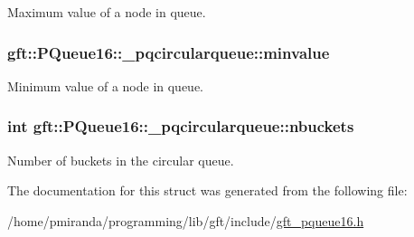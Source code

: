 Maximum value of a node in queue. 

\subsubsection[{\texorpdfstring{minvalue}{minvalue}}]{ gft\+::\+P\+Queue16\+::\+\_\+pqcircularqueue\+::minvalue}\hypertarget{structgft_1_1PQueue16_1_1__pqcircularqueue_a7cceb7dbbae52c61f53e44735ebb8156}{}\label{structgft_1_1PQueue16_1_1__pqcircularqueue_a7cceb7dbbae52c61f53e44735ebb8156}


Minimum value of a node in queue. 

\subsubsection[{\texorpdfstring{nbuckets}{nbuckets}}]{\setlength{\rightskip}{0pt plus 5cm}int gft\+::\+P\+Queue16\+::\+\_\+pqcircularqueue\+::nbuckets}\hypertarget{structgft_1_1PQueue16_1_1__pqcircularqueue_a04b672c1f097742297f79ca45672f248}{}\label{structgft_1_1PQueue16_1_1__pqcircularqueue_a04b672c1f097742297f79ca45672f248}


Number of buckets in the circular queue. 



The documentation for this struct was generated from the following file\+:\begin{DoxyCompactItemize}
\item 
/home/pmiranda/programming/lib/gft/include/\hyperlink{gft__pqueue16_8h}{gft\+\_\+pqueue16.\+h}\end{DoxyCompactItemize}
